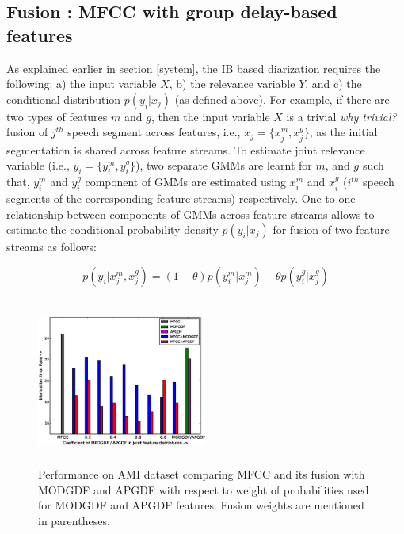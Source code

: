 \documentclass[conference]{IEEEtran}
\begin{document}
\subsection{Fusion : MFCC with group delay-based features}
\label{feature_fusion}

As explained earlier in section \ref{system}, the IB based diarization requires
the following: a) the input variable $X$, b) the relevance variable $Y$, and c)
the conditional distribution $p(y_i|x_j)$ (as defined above). For example, if
there are two types of features $m$ and $g$, then the input variable $X$ is a
trivial \textit{why trivial?} fusion of $j^{th}$ speech segment across features,
i.e., $x_j = \{x^{m}_j,x^{g}_j\}$, as the initial segmentation is shared across
feature streams. To estimate joint relevance variable (i.e., $y_i = \{
y_i^{m},y_i^{g}\}$), two separate GMMs are learnt for $m$, and $g$ such
that, $y_i^{m}$ and $y_i^{g}$ component of GMMs are estimated using
$x^{m}_i$ and $x^{g}_i$ ($i^{th}$ speech segments of the corresponding
feature streams) respectively. One to one relationship between
components of GMMs across feature streams allows to estimate the
conditional probability density $p(y_i|x_j)$ for fusion of two feature
streams as follows:

\begin{equation}
p(y_i|x^{m}_j,x^{g}_j) =  (1-\theta)  p(y_i^{m}|x^{m}_j) +  \theta  p(y_i^{g}|x^{g}_j)
\label{eq:feat_combs}
\end{equation}

\begin{figure}[h]
\centering
\includegraphics[width=0.5\textwidth,height=5.5cm]{figures/newFusionResults.eps}
\caption{Performance on AMI dataset comparing MFCC and its fusion with MODGDF
and APGDF with respect to weight of probabilities used for MODGDF and APGDF
features. Fusion weights are mentioned in parentheses.}
\label{fig:fusionResults}
\end{figure}
\end{document}
